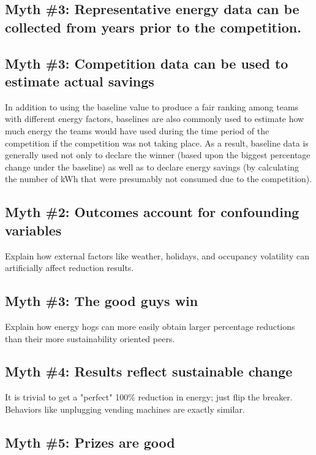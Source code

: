 \documentclass[jou]{apa} %
\begin{document}
\subsection{Myth \#3: Representative energy data can be collected from years  prior to the competition.}






\subsection{Myth \#3: Competition data can be used to estimate actual savings}

In addition to using the baseline value to produce a fair ranking among teams with
different energy factors, baselines are also commonly used to estimate how much energy the
teams would have used during the time period of the competition if the competition was not
taking place.  As a result, baseline data is generally used not only to declare the winner
(based upon the biggest percentage change under the baseline) as well as to declare energy
savings (by calculating the number of kWh that were presumably not consumed due to the
competition).

\subsection{Myth \#2: Outcomes account for confounding variables}

Explain how external factors like weather, holidays, and occupancy volatility can
artificially affect reduction results.

\subsection{Myth \#3: The good guys win}

Explain how energy hogs can more easily obtain larger percentage reductions than their
more sustainability oriented peers.

\subsection{Myth \#4: Results reflect sustainable change}

It is trivial to get a "perfect" 100\% reduction in energy; just flip the breaker.
Behaviors like unplugging vending machines are exactly similar.

\subsection{Myth \#5: Prizes are good}
\end{document}
